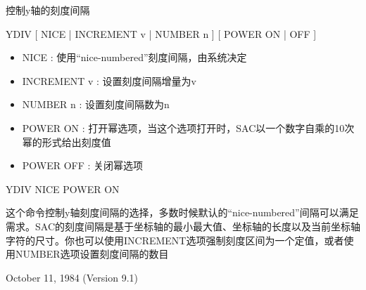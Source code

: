 \label{cmd:ydiv}

控制y轴的刻度间隔

YDIV [ NICE | INCREMENT v | NUMBER n ] [ POWER ON | OFF ]

\begin{itemize}
\item NICE : 使用``nice-numbered''刻度间隔，由系统决定 
\item INCREMENT v : 设置刻度间隔增量为v  
\item NUMBER n : 设置刻度间隔数为n  
\item POWER ON : 打开幂选项，当这个选项打开时，SAC以一个数字自乘的10次幂的形式给出刻度值 
\item POWER OFF : 关闭幂选项 
\end{itemize}

YDIV NICE POWER ON

这个命令控制y轴刻度间隔的选择，多数时候默认的``nice-numbered''间隔可以满足需求。SAC的刻度间隔是基于坐标轴的最小最大值、坐标轴的长度以及当前坐标轴字符的尺寸。你也可以使用INCREMENT选项强制刻度区间为一个定值，或者使用NUMBER选项设置刻度间隔的数目

October 11, 1984 (Version 9.1)
